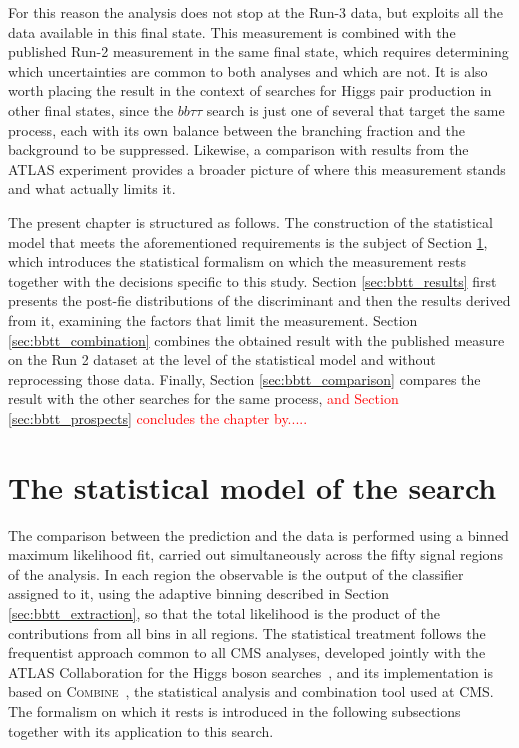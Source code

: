 For this reason the analysis does not stop at the Run-3 data, but exploits all the data available in this final state. This measurement is combined with the published Run-2 measurement in the same final state, which requires determining which uncertainties are common to both analyses and which are not. It is also worth placing the result in the context of searches for Higgs pair production in other final states, since the $bb\tau\tau$ search is just one of several that target the same process, each with its own balance between the branching fraction and the background to be suppressed. Likewise, a comparison with results from the ATLAS experiment provides a broader picture of where this measurement stands and what actually limits it.\medskip

The present chapter is structured as follows. The construction of the statistical model that meets the aforementioned requirements is the subject of Section \ref{sec:bbtt_statistics}, which introduces the statistical formalism on which the measurement rests together with the decisions specific to this study. Section \ref{sec:bbtt_results} first presents the post-fie distributions of the discriminant and then the results derived from it, examining the factors that limit the measurement. Section \ref{sec:bbtt_combination} combines the obtained result with the published measure on the Run 2 dataset at the level of the statistical model and without reprocessing those data. Finally, Section \ref{sec:bbtt_comparison} compares the result with the other searches for the same process, \textcolor{red}{and Section \ref{sec:bbtt_prospects} concludes the chapter by.....}



\section{The statistical model of the search}
\label{sec:bbtt_statistics}
%
The comparison between the prediction and the data is performed using a binned maximum likelihood fit, carried out simultaneously across the fifty signal regions of the analysis. In each region the observable is the output of the classifier assigned to it, using the adaptive binning described in Section \ref{sec:bbtt_extraction}, so that the total likelihood is the product of the contributions from all bins in all regions. The statistical treatment follows the frequentist approach common to all CMS analyses, developed jointly with the ATLAS Collaboration for the Higgs boson searches~\cite{ATLAS:2011tau}, and its implementation is based on \textsc{Combine}~\cite{CMS-combine}, the statistical analysis and combination tool used at CMS. The formalism on which it rests is introduced in the following subsections together with its application to this search.


